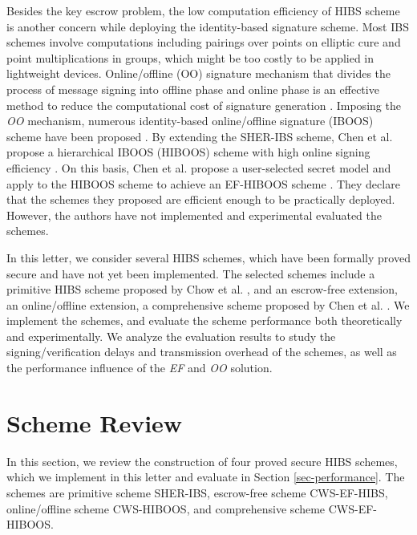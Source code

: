 \documentclass[letter]{ieice}
\begin{document}
Besides the key escrow problem, the low computation efficiency of HIBS scheme is another concern while deploying the identity-based signature scheme.
Most IBS schemes involve computations including pairings over points on elliptic cure and point multiplications in groups, which might be too costly to be applied in lightweight devices.
Online/offline (OO) signature mechanism that divides the process of message signing into offline phase and online phase is an effective method to reduce the computational cost of signature generation \cite{even1990line}. 
Imposing the \emph{OO} mechanism, numerous identity-based online/offline signature (IBOOS) scheme have been proposed \cite{ming2010improved,chen2015ahiboos,chen2015efhiboos}. 
By extending the SHER-IBS scheme, Chen et al. propose a hierarchical IBOOS (HIBOOS) scheme with high online signing efficiency \cite{chen2015ahiboos}.
On this basis, Chen et al. propose a user-selected secret model and apply to the HIBOOS scheme to achieve an EF-HIBOOS scheme \cite{chen2015efhiboos}. 
They declare that the schemes they proposed are efficient enough to be practically deployed.
However, the authors have not implemented and experimental evaluated the schemes. 
\par

In this letter, we consider several HIBS schemes, which have been formally proved secure and have not yet been implemented.
The selected schemes include a primitive HIBS scheme proposed by Chow et al.  \cite{chow2004secure}, and an escrow-free extension, an online/offline extension, a comprehensive scheme proposed by Chen et al. \cite{anescrowfree2015chen,chen2015ahiboos,chen2015efhiboos}.
We implement the schemes, and evaluate the scheme performance both theoretically and experimentally. 
We analyze the evaluation results to study the signing/verification delays and transmission overhead of the schemes, as well as the performance influence of the \emph{EF} and \emph{OO} solution.

\section{Scheme Review} \label{sec-review}
In this section, we review the construction of four proved secure HIBS schemes, which we implement in this letter and evaluate in Section \ref{sec-performance}.
The schemes are primitive scheme SHER-IBS, escrow-free scheme CWS-EF-HIBS, online/offline scheme CWS-HIBOOS, and comprehensive scheme CWS-EF-HIBOOS. 
\end{document}
